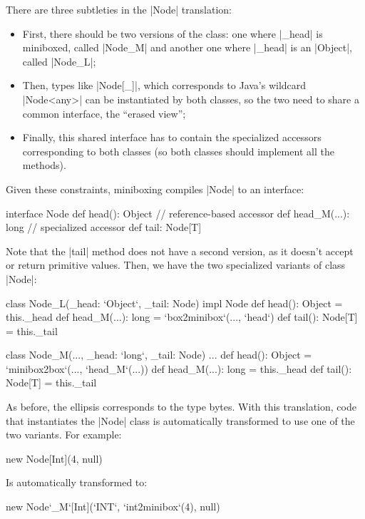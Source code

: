 There are three subtleties in the |Node| translation:
\begin{itemize}
  \item First, there should be two versions of the class: one where |_head| is miniboxed, called |Node_M| and another one where |_head| is an |Object|, called |Node_L|;
  \item Then, types like |Node[_]|, which corresponds to Java's wildcard |Node<any>| can be instantiated by both classes, so the two need to share a common interface, the ``erased view'';
  \item Finally, this shared interface has to contain the specialized accessors corresponding to both classes (so both classes should implement all the methods).
\end{itemize}

Given these constraints, miniboxing compiles |Node| to an interface:

\begin{lstlisting-nobreak}
 interface Node {
   def head(): Object           // reference-based accessor
   def head_M(...): long // specialized accessor
   def tail: Node[T]
 }
\end{lstlisting-nobreak}

Note that the |tail| method does not have a second version, as it doesn't accept or return primitive values. Then, we have the two specialized variants of class |Node|:

\begin{lstlisting-nobreak}
 class Node_L(_head: `Object`, _tail: Node) impl Node {
   def head(): Object = this._head
   def head_M(...): long = `box2minibox`(..., `head`)
   def tail(): Node[T] = this._tail
 }

 class Node_M(..., _head: `long`, _tail: Node) ... {
   def head(): Object = `minibox2box`(..., `head_M`(...))
   def head_M(...): long = this._head
   def tail(): Node[T] = this._tail
 }
\end{lstlisting-nobreak}

As before, the ellipsis corresponds to the type bytes. With this translation, code that instantiates the |Node| class is automatically transformed to use one of the two variants. For example:

\begin{lstlisting-nobreak}
 new Node[Int](4, null)
\end{lstlisting-nobreak}

Is automatically transformed to:

\begin{lstlisting-nobreak}
 new Node`_M`[Int](`INT`, `int2minibox`(4), null)
\end{lstlisting-nobreak}

